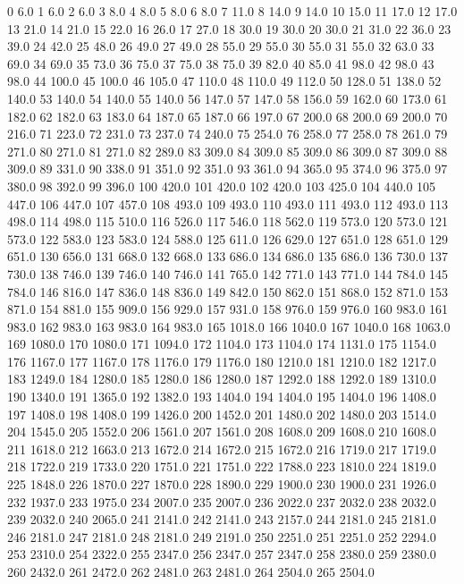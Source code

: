 0 6.0
1 6.0
2 6.0
3 8.0
4 8.0
5 8.0
6 8.0
7 11.0
8 14.0
9 14.0
10 15.0
11 17.0
12 17.0
13 21.0
14 21.0
15 22.0
16 26.0
17 27.0
18 30.0
19 30.0
20 30.0
21 31.0
22 36.0
23 39.0
24 42.0
25 48.0
26 49.0
27 49.0
28 55.0
29 55.0
30 55.0
31 55.0
32 63.0
33 69.0
34 69.0
35 73.0
36 75.0
37 75.0
38 75.0
39 82.0
40 85.0
41 98.0
42 98.0
43 98.0
44 100.0
45 100.0
46 105.0
47 110.0
48 110.0
49 112.0
50 128.0
51 138.0
52 140.0
53 140.0
54 140.0
55 140.0
56 147.0
57 147.0
58 156.0
59 162.0
60 173.0
61 182.0
62 182.0
63 183.0
64 187.0
65 187.0
66 197.0
67 200.0
68 200.0
69 200.0
70 216.0
71 223.0
72 231.0
73 237.0
74 240.0
75 254.0
76 258.0
77 258.0
78 261.0
79 271.0
80 271.0
81 271.0
82 289.0
83 309.0
84 309.0
85 309.0
86 309.0
87 309.0
88 309.0
89 331.0
90 338.0
91 351.0
92 351.0
93 361.0
94 365.0
95 374.0
96 375.0
97 380.0
98 392.0
99 396.0
100 420.0
101 420.0
102 420.0
103 425.0
104 440.0
105 447.0
106 447.0
107 457.0
108 493.0
109 493.0
110 493.0
111 493.0
112 493.0
113 498.0
114 498.0
115 510.0
116 526.0
117 546.0
118 562.0
119 573.0
120 573.0
121 573.0
122 583.0
123 583.0
124 588.0
125 611.0
126 629.0
127 651.0
128 651.0
129 651.0
130 656.0
131 668.0
132 668.0
133 686.0
134 686.0
135 686.0
136 730.0
137 730.0
138 746.0
139 746.0
140 746.0
141 765.0
142 771.0
143 771.0
144 784.0
145 784.0
146 816.0
147 836.0
148 836.0
149 842.0
150 862.0
151 868.0
152 871.0
153 871.0
154 881.0
155 909.0
156 929.0
157 931.0
158 976.0
159 976.0
160 983.0
161 983.0
162 983.0
163 983.0
164 983.0
165 1018.0
166 1040.0
167 1040.0
168 1063.0
169 1080.0
170 1080.0
171 1094.0
172 1104.0
173 1104.0
174 1131.0
175 1154.0
176 1167.0
177 1167.0
178 1176.0
179 1176.0
180 1210.0
181 1210.0
182 1217.0
183 1249.0
184 1280.0
185 1280.0
186 1280.0
187 1292.0
188 1292.0
189 1310.0
190 1340.0
191 1365.0
192 1382.0
193 1404.0
194 1404.0
195 1404.0
196 1408.0
197 1408.0
198 1408.0
199 1426.0
200 1452.0
201 1480.0
202 1480.0
203 1514.0
204 1545.0
205 1552.0
206 1561.0
207 1561.0
208 1608.0
209 1608.0
210 1608.0
211 1618.0
212 1663.0
213 1672.0
214 1672.0
215 1672.0
216 1719.0
217 1719.0
218 1722.0
219 1733.0
220 1751.0
221 1751.0
222 1788.0
223 1810.0
224 1819.0
225 1848.0
226 1870.0
227 1870.0
228 1890.0
229 1900.0
230 1900.0
231 1926.0
232 1937.0
233 1975.0
234 2007.0
235 2007.0
236 2022.0
237 2032.0
238 2032.0
239 2032.0
240 2065.0
241 2141.0
242 2141.0
243 2157.0
244 2181.0
245 2181.0
246 2181.0
247 2181.0
248 2181.0
249 2191.0
250 2251.0
251 2251.0
252 2294.0
253 2310.0
254 2322.0
255 2347.0
256 2347.0
257 2347.0
258 2380.0
259 2380.0
260 2432.0
261 2472.0
262 2481.0
263 2481.0
264 2504.0
265 2504.0
